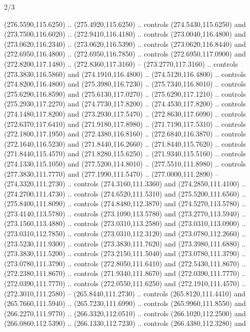 \begin{flagdescription}{2/3}
\begin{scope}[xshift=0.5\flaglength,yshift=0.5\flagwidth,scale=\flagwidth/259.2]
\begin{scope}[y=0.8pt, x=0.8pt, yscale=-1,shift={(-243,-162)}]
      (276.5590,115.6250) .. (275.4920,115.6250) .. controls (274.5430,115.6250) and
      (273.7500,116.6020) .. (272.9410,116.4180) .. controls (273.0040,116.4800) and
      (273.0620,116.2340) .. (273.0620,116.5390) .. controls (273.0620,116.8440) and
      (272.6950,116.4800) .. (272.6950,116.7850) .. controls (272.6950,117.0900) and
      (272.8200,117.1480) .. (272.8360,117.3160) -- (273.2770,117.3160) .. controls
      (273.3830,116.5860) and (274.1910,116.4800) .. (274.5120,116.4800) .. controls
      (274.8200,116.4800) and (275.3980,116.7230) .. (275.7340,116.8010) .. controls
      (275.6290,116.8590) and (275.6130,117.0270) .. (275.6290,117.1210) .. controls
      (275.2930,117.2270) and (274.7730,117.8200) .. (274.4530,117.8200) .. controls
      (274.1480,117.8200) and (273.2930,117.5470) .. (272.8630,117.6090) .. controls
      (272.6370,117.6410) and (271.9180,117.8980) .. (271.7190,117.5310) .. controls
      (272.1800,117.1950) and (272.4380,116.8160) .. (272.6840,116.3870) .. controls
      (272.1640,116.5230) and (271.8440,116.2660) .. (271.8440,115.7620) .. controls
      (271.8440,115.4570) and (271.8280,115.6250) .. (271.9340,115.5160) .. controls
      (274.1330,115.1050) and (277.5200,114.8010) .. (277.5510,111.8980) .. controls
      (277.3830,111.7770) and (277.1990,111.5470) .. (277.0000,111.2890) --
      (274.3320,111.2730) .. controls (274.3160,111.3360) and (274.2850,111.4100) ..
      (274.2700,111.4730) .. controls (274.6520,111.5310) and (275.5200,111.6560) ..
      (275.8400,111.8090) .. controls (274.8480,112.3870) and (274.5270,113.5780) ..
      (273.4140,113.5780) .. controls (273.1090,113.5780) and (273.2770,113.5940) ..
      (273.1560,113.4880) .. controls (273.0310,113.2580) and (273.0310,113.0900) ..
      (273.0310,112.7850) .. controls (273.0310,112.3120) and (273.0780,112.2660) ..
      (273.5230,111.9300) .. controls (273.3830,111.7620) and (273.3980,111.6880) ..
      (273.3830,111.5200) .. controls (273.2150,111.5040) and (273.0780,111.3790) ..
      (273.0780,111.3790) .. controls (272.8050,111.6410) and (272.5430,111.8670) ..
      (272.2380,111.8670) .. controls (271.9340,111.8670) and (272.0390,111.7770) ..
      (272.0390,111.7770) .. controls (272.0550,111.6250) and (272.1910,111.4570) ..
      (272.3010,111.2580) -- (265.8440,111.2730) .. controls (265.8120,111.4410) and
      (265.7660,111.5940) .. (265.7230,111.6990) .. controls (265.9960,111.8550) and
      (266.2270,111.9770) .. (266.3320,112.0510) .. controls (266.1020,112.2500) and
      (266.0860,112.5390) .. (266.1330,112.7230) .. controls (266.4380,112.3280) and

\end{scope}
\end{scope}
\end{flagdescription}
